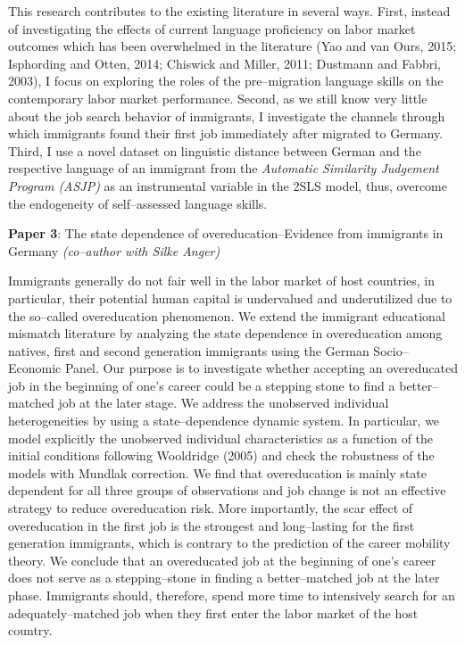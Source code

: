 \documentclass[a4paper, 11pt]{article} %
\begin{document}
This research contributes to the existing literature in several ways. First, instead of investigating the effects of current language proficiency on labor market outcomes which has been overwhelmed in the literature (Yao and van Ours, 2015; Isphording and Otten, 2014; Chiswick and Miller, 2011; Dustmann and Fabbri, 2003), I focus on exploring the roles of the pre--migration language skills on the contemporary labor market performance. Second, as we still know very little about the job search behavior of immigrants, I investigate the channels through which immigrants found their first job immediately after migrated to Germany. Third, I use a novel dataset on linguistic distance between German and the respective language of an immigrant from the \textit{Automatic Similarity Judgement Program (ASJP)} as an instrumental variable in the 2SLS model, thus, overcome the endogeneity of self--assessed language skills.

\vspace{15pt}

\textbf{Paper 3}: The state dependence of overeducation--Evidence from immigrants in Germany \textit{(co--author with Silke Anger)}

\vspace{15pt}

Immigrants generally do not fair well in the labor market of host countries, in particular, their potential human capital is undervalued and underutilized due to the so--called overeducation phenomenon. We extend the immigrant educational mismatch literature by analyzing the state dependence in overeducation among natives, first and second generation immigrants using the German Socio--Economic Panel. Our purpose is to investigate whether accepting an overeducated job in the beginning of one's career could be a stepping stone to find a better--matched job at the later stage. We address the unobserved individual heterogeneities by using a state--dependence dynamic system. In particular, we model explicitly the unobserved individual characteristics as a function of the initial conditions following Wooldridge (2005) and check the robustness of the models with Mundlak correction. We find that overeducation is mainly state dependent for all three groups of observations and job change is not an effective strategy to reduce overeducation risk. More importantly, the scar effect of overeducation in the first job is the strongest and long--lasting for the first generation immigrants, which is contrary to the prediction of the career mobility theory. We conclude that an overeducated job at the beginning of one's career does not serve as a stepping--stone in finding a better--matched job at the later phase. Immigrants should, therefore, spend more time to intensively search for an adequately--matched job when they first enter the labor market of the host country.
\end{document}
